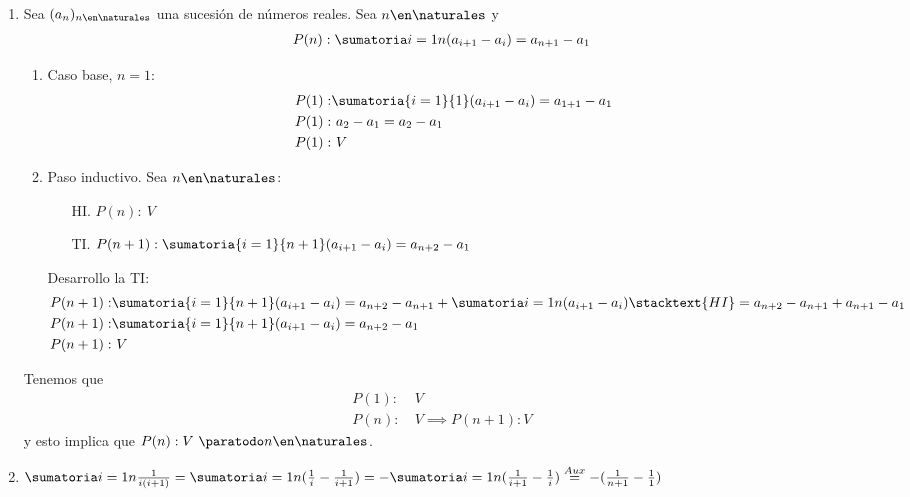 \begin{enumerate}[label=\roman*)]

	\item Sea $(a_n)_{n \en \naturales }$ una sucesión de números reales. Sea $n \en \naturales $ y
	      \begin{align*}
		      P(n): \suma1n(a_{i+1} - a_i) = a_{n+1} - a_1
	      \end{align*}
	      \begin{enumerate}[label=\arabic*)]

		      \item Caso base, $ n = 1$:
		            \begin{align*}
			            P(1): & \sumatoria{i = 1}{1} (a_{i+1} - a_i) = a_{1+1} - a_1 \\
			            P(1): & \ a_2 - a_1 = a_2 - a_1                              \\
			            P(1): & \ V
		            \end{align*}

		      \item Paso inductivo. Sea $n \en \naturales $:
		            \begin{enumerate}
			            \item[HI.] $P(n): \ V$
			            \item[TI.] $ P(n+1):  \sumatoria{i=1}{n+1} (a_{i+1} - a_i) = a_{n+2} - a_1 $
		            \end{enumerate}
		            Desarrollo la TI:
		            \begin{align*}
			            P(n+1): & \sumatoria{i=1}{n+1} (a_{i+1} - a_i) =
			            a_{n+2} - a_{n+1} + \suma1n(a_{i+1} - a_i) \stacktext{HI}= a_{n+2} - a_{n+1} + a_{n+1} - a_1 \\
			            P(n+1): & \sumatoria{i=1}{n+1}(a_{i+1} - a_i) = a_{n+2} - a_1                                \\
			            P(n+1): & \ V
		            \end{align*}
	      \end{enumerate}

	      Tenemos que
	      \begin{align*}
		      P(1): & \ V                   \\
		      P(n): & \ V \implies P(n+1):V
	      \end{align*}
	      y esto implica que $P(n): V \ \paratodo n \en \naturales $.

	\item $\suma1n \frac{1}{i ( i + 1 )} =
	      \suma1n (\frac{1}{i}- \frac{1}{i+1}) =
	      - \suma1n (\frac{1}{i+1} - \frac{1}{i} ) \overset{Aux}{=}
	      - (\frac{1}{n+1}-\frac{1}{1}) \\$


\end{enumerate}
